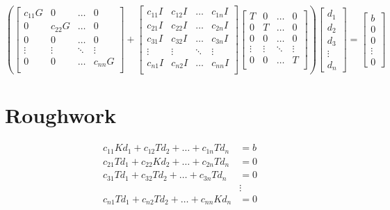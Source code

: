 \documentclass[]{article}
\begin{document}
	\begin{equation}
		\left(\begin{bmatrix}
			c_{11}G & 0 & \ldots & 0\\
			0 & c_{22}G  & \ldots & 0\\
			0 & 0& \ldots & 0\\
			\vdots & \vdots  & \ddots & \vdots \\
			0 & 0 & \ldots & c_{nn}G \\
		\end{bmatrix}+
		\begin{bmatrix}
			c_{11}I & c_{12}I & \ldots & c_{1n}I\\
			c_{21}I & c_{22}I  & \ldots & c_{2n}I\\
			c_{31}I & c_{32}I & \ldots & c_{3n}I\\
			\vdots & \vdots  & \ddots & \vdots \\
			c_{n1}I & c_{n2}I & \ldots & c_{nn}I \\
		\end{bmatrix}
		\begin{bmatrix}
			T & 0 & \ldots & 0\\
			0 & T & \ldots & 0\\
			0 & 0 & \ldots & 0\\
			\vdots & \vdots  & \ddots & \vdots \\
			0& 0 & \ldots & T\\
		\end{bmatrix}
		\right)
		\begin{bmatrix}
			d_1\\d_2\\d_3\\\vdots\\d_n
		\end{bmatrix}
		=
		\begin{bmatrix}
			b\\0\\0\\\vdots\\0
		\end{bmatrix}
	\end{equation}


	
\section{Roughwork}
	\begin{align}
		c_{11}Kd_1 + c_{12}Td_2 + \ldots + c_{1n}Td_n &= b\\
		c_{21}Td_1 + c_{22}Kd_2 + \ldots + c_{2n}Td_n &= 0\\
		c_{31}Td_1 + c_{32}Td_2 + \ldots + c_{3n}Td_n &= 0\\
		&\vdots\\
		c_{n1}Td_1 + c_{n2}Td_2 + \ldots + c_{nn}Kd_n &= 0
	\end{align}
\end{document}
